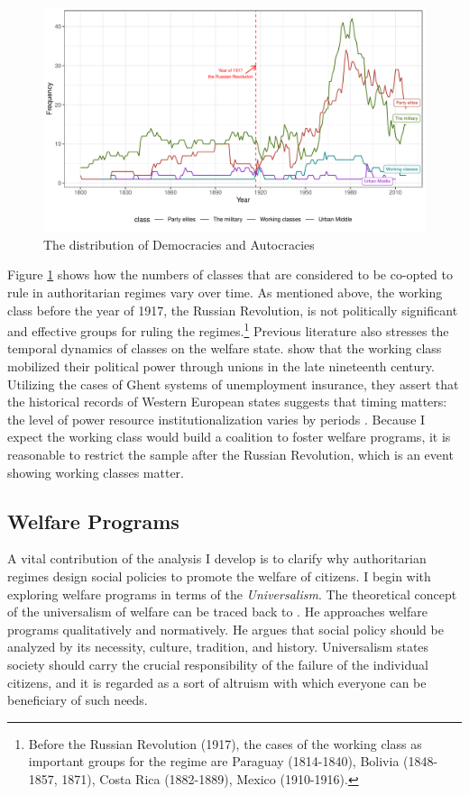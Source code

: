 \documentclass[11pt]{article}
\begin{document}
\begin{figure}[!htbt]
	\centering
	\includegraphics[width=1\linewidth]{"../3. Datasets_Codebooks/Figures/Plot3"}
	\caption{The distribution of Democracies and Autocracies}
	\label{fig:plot2}
\end{figure}

Figure \ref{fig:plot2} shows how the numbers of classes that are considered to be co-opted to rule in authoritarian regimes vary over time. As mentioned above, the working class before the year of 1917, the Russian Revolution, is not politically significant and effective groups for ruling the regimes.\footnote{Before the Russian Revolution (1917), the cases of the working class as important groups for the regime are Paraguay (1814-1840), Bolivia (1848-1857, 1871), Costa Rica (1882-1889), Mexico (1910-1916).} Previous literature also stresses the temporal dynamics of classes on the welfare state. \citet{Rasmussen2018} show that the working class mobilized their political power through unions in the late nineteenth century. Utilizing the cases of Ghent systems of unemployment insurance, they assert that the historical records of Western European states suggests that timing matters: the level of power resource institutionalization varies by periods \citep[821-822]{Rasmussen2018}. Because I expect the working class would build a coalition to foster welfare programs, it is reasonable to restrict the sample after the Russian Revolution, which is an event showing working classes matter. 


\subsection{Welfare Programs}

A vital contribution of the analysis I develop is to clarify why authoritarian regimes design social policies to promote the welfare of citizens. I begin with exploring welfare programs in terms of the \textit{Universalism}. The theoretical concept of the universalism of welfare can be traced back to \citet{Titmuss1974}. He approaches welfare programs qualitatively and normatively. He argues that social policy should be analyzed by its necessity, culture, tradition, and history. Universalism states society should carry the crucial responsibility of the failure of the individual citizens, and it is regarded as a sort of altruism with which everyone can be beneficiary of such needs. 
\end{document}
